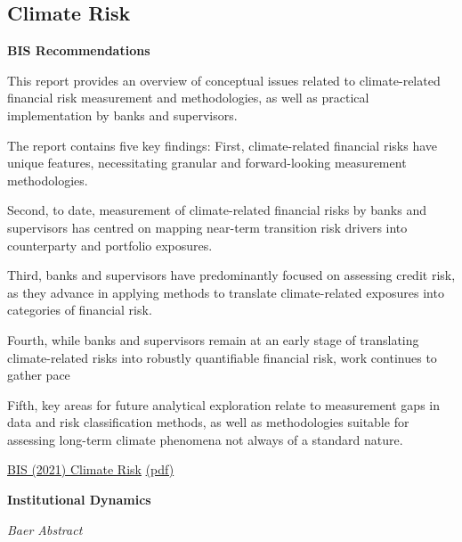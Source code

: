 \documentclass[
]{book}
\begin{document}
\hypertarget{climate-risk-1}{%
\subsection{Climate Risk}\label{climate-risk-1}}

\textbf{BIS Recommendations}

This report provides an overview of conceptual issues related to climate-related financial risk
measurement and methodologies, as well as practical implementation by banks and supervisors.

The report contains five key findings:
First, climate-related financial risks have unique features, necessitating granular and
forward-looking measurement methodologies.

Second, to date, measurement of climate-related financial risks by banks and supervisors
has centred on mapping near-term transition risk drivers into counterparty and portfolio exposures.

Third, banks and supervisors have predominantly focused on assessing credit risk, as they
advance in applying methods to translate climate-related exposures into categories of financial risk.

Fourth, while banks and supervisors remain at an early stage of translating climate-related
risks into robustly quantifiable financial risk, work continues to gather pace

Fifth, key areas for future analytical exploration relate to measurement gaps in data and
risk classification methods, as well as methodologies suitable for assessing long-term climate
phenomena not always of a standard nature.

\href{https://www.bis.org/bcbs/publ/d518.htm}{BIS (2021) Climate Risk}
\href{pdf/BIS_2021_Climate_Risk.pdf}{(pdf)}

\textbf{Institutional Dynamics}

\emph{Baer Abstract}
\end{document}
